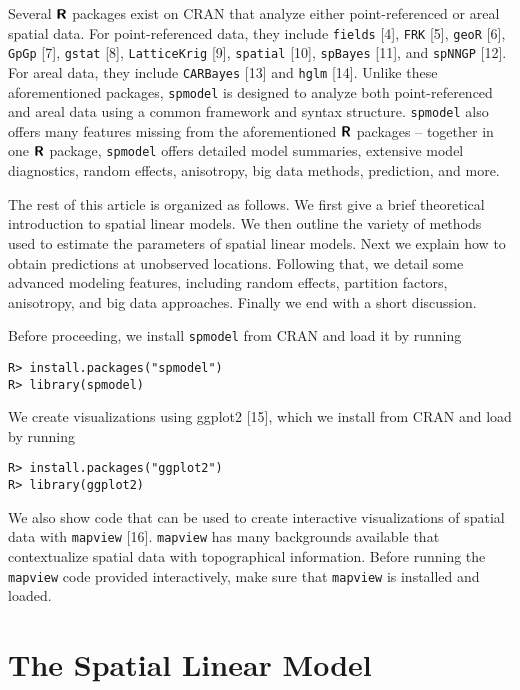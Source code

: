 \documentclass[10pt,letterpaper]{article}
\begin{document}
Several \(\textbf{\textsf{R}}\) packages exist on CRAN that analyze
either point-referenced or areal spatial data. For point-referenced
data, they include \texttt{fields} {[}4{]}, \texttt{FRK} {[}5{]},
\texttt{geoR} {[}6{]}, \texttt{GpGp} {[}7{]}, \texttt{gstat} {[}8{]},
\texttt{LatticeKrig} {[}9{]}, \texttt{spatial} {[}10{]},
\texttt{spBayes} {[}11{]}, and \texttt{spNNGP} {[}12{]}. For areal data,
they include \texttt{CARBayes} {[}13{]} and \texttt{hglm} {[}14{]}.
Unlike these aforementioned packages, \texttt{spmodel} is designed to
analyze both point-referenced and areal data using a common framework
and syntax structure. \texttt{spmodel} also offers many features missing
from the aforementioned \(\textbf{\textsf{R}}\) packages -- together in
one \(\textbf{\textsf{R}}\) package, \texttt{spmodel} offers detailed
model summaries, extensive model diagnostics, random effects,
anisotropy, big data methods, prediction, and more.

The rest of this article is organized as follows. We first give a brief
theoretical introduction to spatial linear models. We then outline the
variety of methods used to estimate the parameters of spatial linear
models. Next we explain how to obtain predictions at unobserved
locations. Following that, we detail some advanced modeling features,
including random effects, partition factors, anisotropy, and big data
approaches. Finally we end with a short discussion.

Before proceeding, we install \texttt{spmodel} from CRAN and load it by
running

\begin{verbatim}
R> install.packages("spmodel")
R> library(spmodel)
\end{verbatim}

We create visualizations using ggplot2 {[}15{]}, which we install from
CRAN and load by running

\begin{verbatim}
R> install.packages("ggplot2")
R> library(ggplot2)
\end{verbatim}

We also show code that can be used to create interactive visualizations
of spatial data with \texttt{mapview} {[}16{]}. \texttt{mapview} has
many backgrounds available that contextualize spatial data with
topographical information. Before running the \texttt{mapview} code
provided interactively, make sure that \texttt{mapview} is installed and
loaded.

\hypertarget{sec:theomodel}{%
\section{The Spatial Linear Model}\label{sec:theomodel}}
\end{document}
